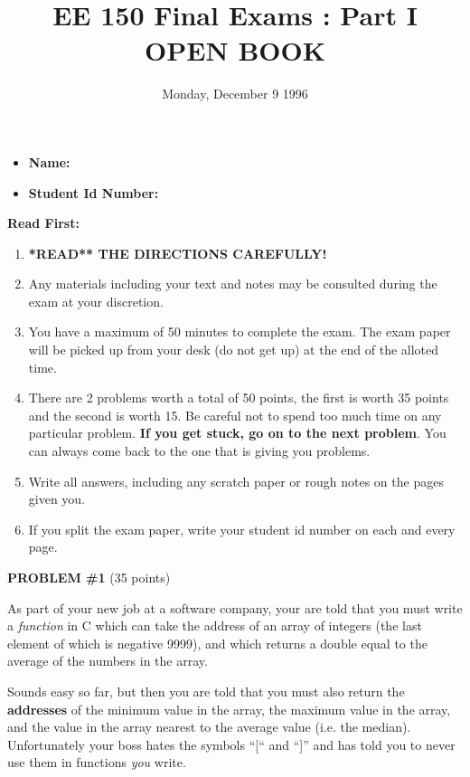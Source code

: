 \setcounter{page}{1}



\title{EE 150 Final Exams : Part I \\ {\bf OPEN BOOK}}
\author{Monday, December 9 1996}
\date{}
\maketitle

\begin{itemize}
\item {\bf Name:}
\item {\bf Student Id Number:}
\end{itemize} 

{\bf Read First:}
\begin{enumerate}
\item [A.] {\bf **READ** THE DIRECTIONS CAREFULLY!}
\item [B.] Any materials including your text and notes may be consulted
during the exam at your discretion. 
\item [C.] You have a maximum of 50 minutes to complete the exam.  The exam
paper will be picked up from your desk (do not get up) at the end of
the alloted time.
\item [D.] There are 2 problems worth a total of 50 points, the first
is worth 35 points and the second is worth 15.  Be careful not to
spend too much time on any particular problem.  {\bf If you get stuck,
go on to the next problem}.  You can always come back to the one that
is giving you problems.   
\item [E.] Write all answers, including any scratch paper or rough 
notes on the pages given you.
\item [F.] If you split the exam paper, write your student id number
on each and every page.
\end{enumerate}

\pagebreak
{\bf PROBLEM \#1} (35 points)

As part of your new job at a software company, your are told that you
must write a {\em function} in C which can take the address of an
array of integers (the last element of which is negative 9999), and
which returns a double equal to the average of the numbers in the
array.  

Sounds easy so far, but then you are told that you must also 
return the {\bf addresses} of the minimum value in the array, the maximum
value in the array, and the value in the array nearest to the average
value (i.e. the median).  Unfortunately your boss hates the symbols
``[`` and ``]'' and has told you to never use them in functions {\em you}
write.


